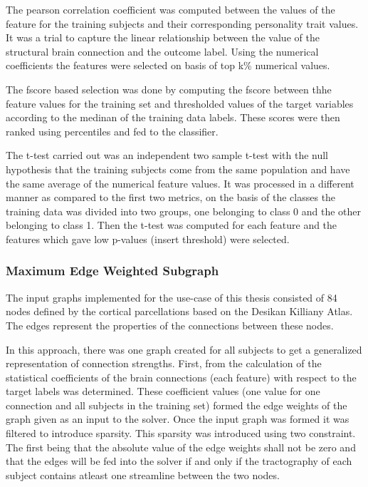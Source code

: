 \documentclass[msthesis.tex]{subfiles}
\begin{document}
The pearson correlation coefficient was computed between the values of the feature for the training subjects and their corresponding personality trait values. It was a trial to capture the linear relationship between the value of the structural brain connection and the outcome label. Using the numerical coefficients the features were selected on basis of top k\% numerical values.

The fscore based selection was done by computing the fscore between thhe feature values for the training set and thresholded values of the target variables according to the medinan of the training data labels. These scores were then ranked using percentiles and fed to the classifier. 

The t-test carried out was an independent two sample t-test with the null hypothesis that the training subjects come from the same population and have the same average of the numerical feature values. It was processed in a different manner as compared to the first two metrics, on the basis of the classes the training data was divided into two groups, one belonging to class 0 and the other belonging to class 1. Then the t-test was computed for each feature and the features which gave low p-values (insert threshold) were selected. 
\subsubsection{Maximum Edge Weighted Subgraph}
The input graphs implemented for the use-case of this thesis consisted of 84 nodes defined by the cortical parcellations based on the Desikan Killiany Atlas. The edges represent the properties of the connections between these nodes. 

In this approach, there was one graph created for all subjects to get a generalized representation of connection strengths. First, from the calculation of the statistical coefficients of the brain connections (each feature) with respect to the target labels was determined. These coefficient values (one value for one connection and all subjects in the training set) formed the edge weights of the graph given as an input to the solver. Once the input graph was formed it was filtered to introduce sparsity. This sparsity was introduced using two constraint. The first being that the absolute value of the edge weights shall not be zero and that the edges will be fed into the solver if and only if the tractography of each subject contains atleast one streamline between the two nodes. 
\end{document}
